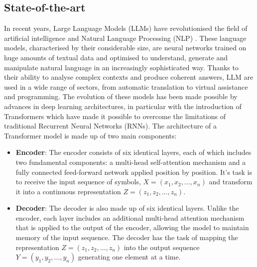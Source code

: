\subsection{State-of-the-art}
\label{sec:stateoftheart}
In recent years, Large Language Models (LLMs) have revolutionised the field of artificial intelligence and Natural Language Processing (NLP) \cite{NLP}.
These language models, characterised by their considerable size, are neural networks trained on huge amounts of textual data and optimised to understand, generate and manipulate natural language in an increasingly sophisticated way.
Thanks to their ability to analyse complex contexts and produce coherent answers, LLM are used in a wide range of sectors, from automatic translation to virtual assistance and programming.
The evolution of these models has been made possible by advances in deep learning architectures, in particular with the introduction of Transformers \cite{Attention}  which have made it possible to overcome the limitations of traditional Recurrent Neural Networks (RNNs).
The architecture of a Transformer model is made up of two main components:\\
\begin{itemize}
    \item \textbf{Encoder}: The encoder consists of six identical layers, each of which includes two fundamental components: a multi-head self-attention mechanism and a fully connected feed-forward network applied position by position. It's task is to receive the input sequence of symbols, \( X = (x_1, x_2, \dots, x_n) \) and transform it into a continuous representation \( Z = (z_1, z_2, \dots, z_n) \).
    \item \textbf{Decoder}: The decoder is also made up of six identical layers. Unlike the encoder, each layer includes an additional multi-head attention mechanism that is applied to the output of the encoder, allowing the model to maintain memory of the input sequence. The decoder has the task of mapping the representation \( Z = (z_1, z_2, \dots, z_n) \) into the output sequence \( Y = (y_1, y_2, \dots, y_n) \) generating one element at a time.
\end{itemize}

